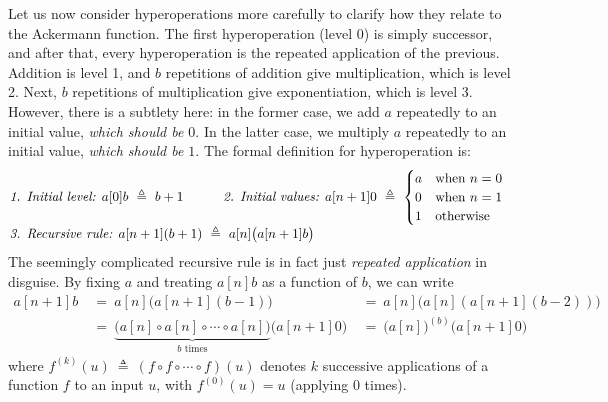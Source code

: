 Let us now consider hyperoperations more carefully
to clarify how they relate to the Ackermann function.
The first hyperoperation (level 0) is simply successor, and after that,
every hyperoperation is the repeated application of the previous.
Addition is level 1, and $b$ repetitions of addition
give multiplication, which is level 2. Next, $b$ repetitions of
multiplication give exponentiation, which is level 3. However,
there is a subtlety here: in the former case, we add $a$
repeatedly to an initial value, \emph{which should be $0$}.
In the latter case, we multiply $a$ repeatedly to an initial value,
\emph{which should be $1$}. The formal definition for hyperoperation is:
\begin{equation}
\label{eq:hyper}
\begin{array}{@{}l@{\qquad\quad}l}
\textit{1. Initial level: } a[0]b ~ \triangleq ~ b + 1 &
\textit{2. Initial values: } a[n+1]0 ~ \triangleq ~
\begin{cases}
a & \text{when } n = 0 \\
0 & \text{when } n = 1 \\
1 & \text{otherwise}
\end{cases}
\\
\multicolumn{2}{@{}l}{\textit{3. Recursive rule: } a[n+1](b+1) ~ \triangleq ~ a[n]\big(a[n+1]b\big)}
\end{array}
\end{equation}
The seemingly complicated recursive rule is in fact just \emph{repeated application} in disguise. By fixing $a$ and treating $a[n]b$ as a function of $b$, we can write
\begin{equation*}
\begin{array}{lll}
a[n+1]b & ~ = ~ a[n]\big(a[n+1](b-1)\big) & ~ = ~ a[n]\big(a[n](a[n+1](b-2))\big) \\
 & ~ = ~ \underbrace{\big( a[n]\circ a[n]\circ \cdots \circ a[n] \big)}_{b \text{ times}} \big(a[n+1]0\big) & ~ = ~ \big(a[n]\big)^{(b)}\big(a[n+1]0\big)
\end{array}
\end{equation*}
where $f^{(k)}(u) ~ \triangleq ~ (f\circ f\circ \cdots \circ f)(u)$ denotes $k$ successive applications of a function $f$ to an input $u$, with $f^{(0)}(u) = u $ (applying $0$ times). %

